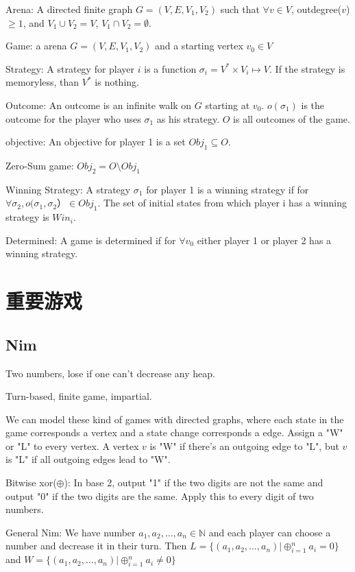 \documentclass[12pt,a4paper]{ctexrep}
\begin{document}
Arena: A directed finite graph $G = (V,E,V_1,V_2)$ such that $\forall v \in V$, outdegree($v$)$\geqslant 1$, and $V_1 \cup V_2 = V$, $V_1 \cap V_2 = \emptyset$.

Game: a arena $G = (V,E,V_1,V_2)$ and a starting vertex $v_0\in V$

Strategy: A strategy for player $i$ is a function $\sigma_i = V^* \times V_i \mapsto V$. If the strategy is memoryless, than $V^*$ is  nothing.

Outcome: An outcome is an infinite walk on $G$ starting at $v_0$. $o(\sigma_1)$ is the outcome for the player who uses $\sigma_1$ as his strategy. $O$ is all outcomes of the game.

objective: An objective for player 1 is a set $Obj_1 \subseteq O$.

Zero-Sum game: $Obj_2 = O \setminus Obj_1$

Winning Strategy: A strategy $\sigma_1$ for player 1 is a winning strategy if for $\forall \sigma_2, o(\sigma_1,\sigma_2） \in Obj_1$. The set of initial states from which player i has a winning strategy is $Win_i$.

Determined: A game is determined if for $\forall v_0$ either player 1 or player 2 has a winning strategy.
\section{重要游戏}
\subsection{Nim}
Two numbers, lose if one can't decrease any heap.

Turn-based, finite game, impartial.

We can model these kind of games with directed graphs, where each state in the game corresponds a vertex and a state change corresponds a edge. Assign a "W" or "L" to every vertex. A vertex $v$ is "W" if there's an outgoing edge to "L", but $v$ is "L" if all outgoing edges lead to "W".

Bitwise xor($\oplus$): In base 2, output "1" if the two digits are not the same and output "0" if the two digits are the same. Apply this to every digit of two numbers.

General Nim: We have number $a_1,a_2,\dots,a_n \in \mathbb{N}$ and each player can choose a number and decrease it in their turn. Then $L = \{(a_1,a_2,\dots,a_n)|\oplus_{i=1}^n a_i = 0\}$ and $W = \{(a_1,a_2,\dots,a_n)|\oplus_{i=1}^n a_i \neq 0\}$
\end{document}
